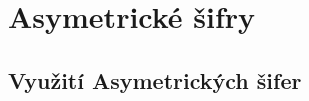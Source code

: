 \section{Asymetrické šifry}
\subsection{Využití Asymetrických šifer}
\label{sec:asymetricka-kryptografie}